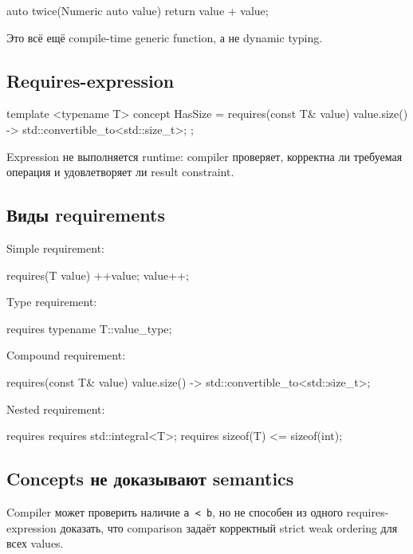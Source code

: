 \begin{cppcode}
auto twice(Numeric auto value) {
    return value + value;
}
\end{cppcode}

Это всё ещё compile-time generic function, а не dynamic typing.

\subsection{Requires-expression}

\begin{cppcode}
template <typename T>
concept HasSize = requires(const T& value) {
    { value.size() } -> std::convertible_to<std::size_t>;
};
\end{cppcode}

Expression не выполняется runtime: compiler проверяет, корректна ли требуемая
операция и удовлетворяет ли result constraint.

\subsection{Виды requirements}

Simple requirement:

\begin{cppcode}
requires(T value) {
    ++value;
    value++;
}
\end{cppcode}

Type requirement:

\begin{cppcode}
requires {
    typename T::value_type;
}
\end{cppcode}

Compound requirement:

\begin{cppcode}
requires(const T& value) {
    { value.size() } -> std::convertible_to<std::size_t>;
}
\end{cppcode}

Nested requirement:

\begin{cppcode}
requires {
    requires std::integral<T>;
    requires sizeof(T) <= sizeof(int);
}
\end{cppcode}

\subsection{Concepts не доказывают semantics}

Compiler может проверить наличие \texttt{a < b}, но не способен из одного
requires-expression доказать, что comparison задаёт корректный strict weak
ordering для всех values.

